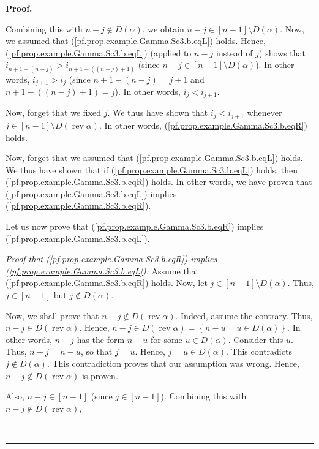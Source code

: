 \documentclass[numbers=enddot,12pt,final,onecolumn,notitlepage,abstracton]{scrartcl}
\theoremstyle{definition}
\newenvironment{proof}[1][Proof]{\noindent\textbf{#1.} }{\ \rule{0.5em}{0.5em}}
\newenvironment{verlong}{}{}
\begin{document}
\begin{verlong}
\begin{footnotesize}
\begin{proof}
{Combining this with $n-j\notin D\left(  \alpha\right)  $, we obtain
$n-j\in\left[  n-1\right]  \setminus D\left(  \alpha\right)  $. Now, we
assumed that (\ref{pf.prop.example.Gamma.Sc3.b.eqL}) holds. Hence,
(\ref{pf.prop.example.Gamma.Sc3.b.eqL}) (applied to $n-j$ instead of $j$)
shows that $i_{n+1-\left(  n-j\right)  }>i_{n+1-\left(  \left(  n-j\right)
+1\right)  }$ (since $n-j\in\left[  n-1\right]  \setminus D\left(
\alpha\right)  $). In other words, $i_{j+1}>i_{j}$ (since $n+1-\left(
n-j\right)  =j+1$ and $n+1-\left(  \left(  n-j\right)  +1\right)  =j$). In
other words, $i_{j}<i_{j+1}$.
\par
Now, forget that we fixed $j$. We thus have shown that $i_{j}<i_{j+1}$
whenever $j\in\left[  n-1\right]  \setminus D\left(  \operatorname*{rev}%
\alpha\right)  $. In other words, (\ref{pf.prop.example.Gamma.Sc3.b.eqR})
holds.
\par
Now, forget that we assumed that (\ref{pf.prop.example.Gamma.Sc3.b.eqL})
holds. We thus have shown that if (\ref{pf.prop.example.Gamma.Sc3.b.eqL})
holds, then (\ref{pf.prop.example.Gamma.Sc3.b.eqR}) holds. In other words, we
have proven that (\ref{pf.prop.example.Gamma.Sc3.b.eqL}) implies
(\ref{pf.prop.example.Gamma.Sc3.b.eqR}).
\par
Let us now prove that (\ref{pf.prop.example.Gamma.Sc3.b.eqR}) implies
(\ref{pf.prop.example.Gamma.Sc3.b.eqL}).
\par
\textit{Proof that (\ref{pf.prop.example.Gamma.Sc3.b.eqR}) implies
(\ref{pf.prop.example.Gamma.Sc3.b.eqL}):} Assume that
(\ref{pf.prop.example.Gamma.Sc3.b.eqR}) holds. Now, let $j\in\left[
n-1\right]  \setminus D\left(  \alpha\right)  $. Thus, $j\in\left[
n-1\right]  $ but $j\notin D\left(  \alpha\right)  $.
\par
Now, we shall prove that $n-j\notin D\left(  \operatorname*{rev}\alpha\right)
$. Indeed, assume the contrary. Thus, $n-j\in D\left(  \operatorname*{rev}%
\alpha\right)  $. Hence, $n-j\in D\left(  \operatorname*{rev}\alpha\right)
=\left\{  n-u\ \mid\ u\in D\left(  \alpha\right)  \right\}  $. In other words,
$n-j$ has the form $n-u$ for some $u\in D\left(  \alpha\right)  $. Consider
this $u$. Thus, $n-j=n-u$, so that $j=u$. Hence, $j=u\in D\left(
\alpha\right)  $. This contradicts $j\notin D\left(  \alpha\right)  $. This
contradiction proves that our assumption was wrong. Hence, $n-j\notin D\left(
\operatorname*{rev}\alpha\right)  $ is proven.
\par
Also, $n-j\in\left[  n-1\right]  $ (since $j\in\left[  n-1\right]  $).
Combining this with $n-j\notin D\left(  \operatorname*{rev}\alpha\right)  $,
}
\end{proof}
\end{footnotesize}
\end{verlong}
\end{document}
